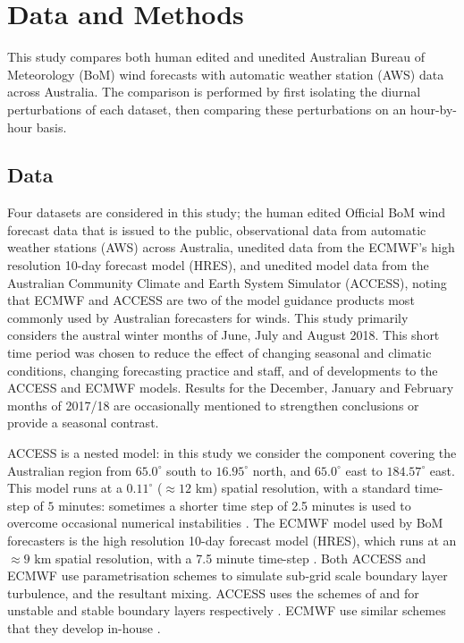 \documentclass[twocol]{ametsoc}
\begin{document}
\section{Data and Methods} \label{Sec:Methods}
This study compares both human edited and unedited Australian Bureau of Meteorology (BoM) wind forecasts with automatic weather station (AWS) data across Australia. The comparison is performed by first isolating the diurnal perturbations of each dataset, then comparing these perturbations on an hour-by-hour basis.

\subsection{Data}
Four datasets are considered in this study; the human edited Official BoM wind forecast data that is issued to the public, observational data from automatic weather stations (AWS) across Australia, unedited data from the ECMWF's high resolution 10-day forecast model (HRES), and unedited model data from the Australian Community Climate and Earth System Simulator (ACCESS), noting that ECMWF and ACCESS are two of the model guidance products most commonly used by Australian forecasters for winds. This study primarily considers the austral winter months of June, July and August 2018. This short time period was chosen to reduce the effect of changing seasonal and climatic conditions, changing forecasting practice and staff, and of developments to the ACCESS and ECMWF models. Results for the December, January and February months of 2017/18  are occasionally mentioned to strengthen conclusions or provide a seasonal contrast. 

ACCESS is a nested model: in this study we consider the component covering the Australian region from $65.0^\circ$ south to $16.95^\circ$ north, and $65.0^\circ$ east to $184.57^\circ$ east. This model runs at a $0.11^\circ$ ($\approx 12$ km) spatial resolution, with a standard time-step of $5$ minutes: sometimes a shorter time step of 2.5 minutes is used to overcome occasional numerical instabilities \citep{bom16}. The ECMWF model used by BoM forecasters is the high resolution 10-day forecast model (HRES), which runs at an $\approx 9$ km spatial resolution, with a 7.5 minute time-step \citep{ecmwf19c}. Both ACCESS and ECMWF use parametrisation schemes to simulate sub-grid scale boundary layer turbulence, and the resultant mixing. ACCESS uses the schemes of \citet{lock00} and \citet{louis79} for unstable and stable boundary layers respectively \citep{bom10}. ECMWF use similar schemes that they develop in-house \citep{ecmwf19a}.
\end{document}
